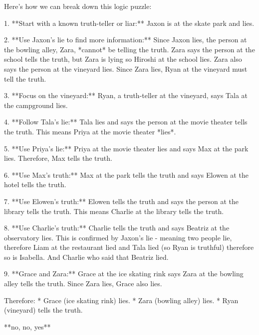 \begin{tcolorbox}[title=Correct Answer, breakable]


\end{tcolorbox}
\begin{tcolorbox}[title=Candidate Response, breakable]

Here's how we can break down this logic puzzle:

1. **Start with a known truth-teller or liar:** Jaxon is at the skate park and lies.

2. **Use Jaxon's lie to find more information:** Since Jaxon lies, the person at the bowling alley, Zara, *cannot* be telling the truth. Zara says the person at the school tells the truth, but Zara is lying so Hiroshi at the school lies. Zara also says the person at the vineyard lies.  Since Zara lies, Ryan at the vineyard must tell the truth.

3. **Focus on the vineyard:** Ryan, a truth-teller at the vineyard, says Tala at the campground lies.

4. **Follow Tala's lie:** Tala lies and says the person at the movie theater tells the truth. This means Priya at the movie theater *lies*.

5. **Use Priya's lie:** Priya at the movie theater lies and says Max at the park lies. Therefore, Max tells the truth.

6. **Use Max's truth:** Max at the park tells the truth and says Elowen at the hotel tells the truth.

7. **Use Elowen's truth:** Elowen tells the truth and says the person at the library tells the truth. This means Charlie at the library tells the truth.

8. **Use Charlie's truth:** Charlie tells the truth and says Beatriz at the observatory lies. This is confirmed by Jaxon's lie - meaning two people lie, therefore Liam at the restaurant lied and Tala lied (so Ryan is truthful) therefore so is Isabella. And Charlie who said that Beatriz lied.

9. **Grace and Zara:** Grace at the ice skating rink says Zara at the bowling alley tells the truth.  Since Zara lies, Grace also lies.

Therefore:
* Grace (ice skating rink) lies.
* Zara (bowling alley) lies.
* Ryan (vineyard) tells the truth.


**no, no, yes** 


\end{tcolorbox}
